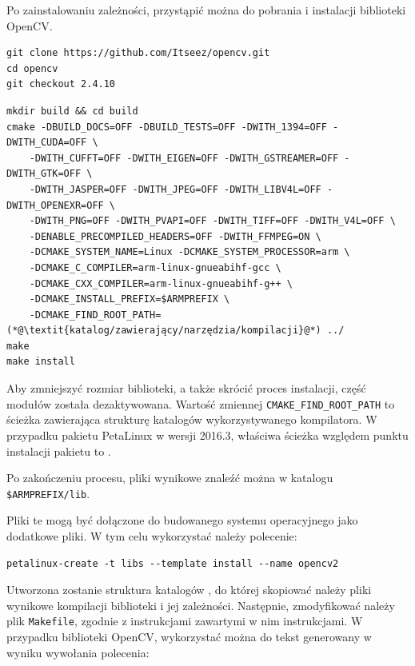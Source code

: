 Po zainstalowaniu zależności, przystąpić można do pobrania i instalacji biblioteki OpenCV.

\begin{lstlisting}[breaklines=true, caption=Pobieranie biblioteki OpenCV w wersji 2.4.10.]
git clone https://github.com/Itseez/opencv.git
cd opencv
git checkout 2.4.10
\end{lstlisting}

\begin{lstlisting}[breaklines=true, caption=Kompilacja biblioteki \textit{OpenCV}.]
mkdir build && cd build
cmake -DBUILD_DOCS=OFF -DBUILD_TESTS=OFF -DWITH_1394=OFF -DWITH_CUDA=OFF \
	-DWITH_CUFFT=OFF -DWITH_EIGEN=OFF -DWITH_GSTREAMER=OFF -DWITH_GTK=OFF \
	-DWITH_JASPER=OFF -DWITH_JPEG=OFF -DWITH_LIBV4L=OFF -DWITH_OPENEXR=OFF \
	-DWITH_PNG=OFF -DWITH_PVAPI=OFF -DWITH_TIFF=OFF -DWITH_V4L=OFF \
	-DENABLE_PRECOMPILED_HEADERS=OFF -DWITH_FFMPEG=ON \
	-DCMAKE_SYSTEM_NAME=Linux -DCMAKE_SYSTEM_PROCESSOR=arm \
	-DCMAKE_C_COMPILER=arm-linux-gnueabihf-gcc \
	-DCMAKE_CXX_COMPILER=arm-linux-gnueabihf-g++ \
	-DCMAKE_INSTALL_PREFIX=$ARMPREFIX \
	-DCMAKE_FIND_ROOT_PATH=(*@\textit{katalog/zawierający/narzędzia/kompilacji}@*) ../
make
make install
\end{lstlisting}

Aby zmniejszyć rozmiar biblioteki, a także skrócić proces instalacji, część modułów została dezaktywowana. Wartość zmiennej \texttt{CMAKE\_FIND\_ROOT\_PATH} to ścieżka zawierająca strukturę katalogów wykorzystywanego kompilatora. W przypadku pakietu PetaLinux w wersji 2016.3, właściwa ścieżka względem punktu instalacji pakietu to .

Po zakończeniu procesu, pliki wynikowe znaleźć można w katalogu \texttt{\$ARMPREFIX/lib}.

Pliki te mogą być dołączone do budowanego systemu operacyjnego jako dodatkowe pliki. W tym celu wykorzystać należy polecenie:

\begin{lstlisting}[breaklines=true]
petalinux-create -t libs --template install --name opencv2
\end{lstlisting}

Utworzona zostanie struktura katalogów , do której skopiować należy pliki wynikowe kompilacji biblioteki i jej zależności. Następnie, zmodyfikować należy plik \texttt{Makefile}, zgodnie z instrukcjami zawartymi w nim instrukcjami. W przypadku biblioteki OpenCV, wykorzystać można do tekst generowany w wyniku wywołania polecenia:

